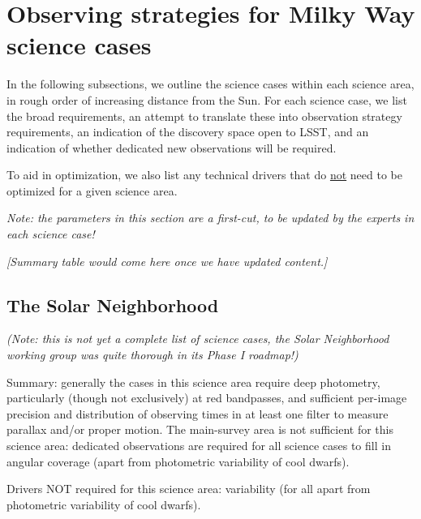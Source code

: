 \navigationbar


\section{Observing strategies for Milky Way science cases}
\def\secname{strategies}\label{sec:\secname}

In the following subsections, we outline the science cases within each
science area, in rough order of increasing distance from the Sun. For
each science case, we list the broad requirements, an attempt to
translate these into observation strategy requirements, an indication
of the discovery space open to LSST, and an indication of whether
dedicated new observations will be required.

To aid in optimization, we also list any technical drivers that do
\underline{not} need to be optimized for a given science area.

{\it Note: the parameters in this section are a first-cut, to be
  updated by the experts in each science case!}

{\it [Summary table would come here once we have updated content.]}

\subsection{The Solar Neighborhood}

{\it (Note: this is not yet a complete list of science cases, the
  Solar Neighborhood working group was quite thorough in its Phase I
  roadmap!)}

Summary: generally the cases in this science area require deep
photometry, particularly (though not exclusively) at red bandpasses,
and sufficient per-image precision and distribution of observing times
in at least one filter to measure parallax and/or proper motion. The
main-survey area is not sufficient for this science area: dedicated
observations are required for all science cases to fill in angular
coverage (apart from photometric variability of cool dwarfs).

Drivers NOT required for this science area: variability (for all apart from photometric variability of cool dwarfs).
\vspace{-2mm}

